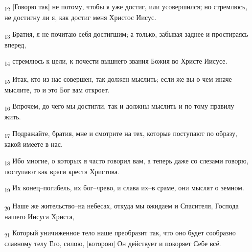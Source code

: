 \begin{tcolorbox}
\textsubscript{12} [Говорю так] не потому, чтобы я уже достиг, или усовершился; но стремлюсь, не достигну ли я, как достиг меня Христос Иисус.
\end{tcolorbox}
\begin{tcolorbox}
\textsubscript{13} Братия, я не почитаю себя достигшим; а только, забывая заднее и простираясь вперед,
\end{tcolorbox}
\begin{tcolorbox}
\textsubscript{14} стремлюсь к цели, к почести вышнего звания Божия во Христе Иисусе.
\end{tcolorbox}
\begin{tcolorbox}
\textsubscript{15} Итак, кто из нас совершен, так должен мыслить; если же вы о чем иначе мыслите, то и это Бог вам откроет.
\end{tcolorbox}
\begin{tcolorbox}
\textsubscript{16} Впрочем, до чего мы достигли, так и должны мыслить и по тому правилу жить.
\end{tcolorbox}
\begin{tcolorbox}
\textsubscript{17} Подражайте, братия, мне и смотрите на тех, которые поступают по образу, какой имеете в нас.
\end{tcolorbox}
\begin{tcolorbox}
\textsubscript{18} Ибо многие, о которых я часто говорил вам, а теперь даже со слезами говорю, поступают как враги креста Христова.
\end{tcolorbox}
\begin{tcolorbox}
\textsubscript{19} Их конец--погибель, их бог--чрево, и слава их--в сраме, они мыслят о земном.
\end{tcolorbox}
\begin{tcolorbox}
\textsubscript{20} Наше же жительство--на небесах, откуда мы ожидаем и Спасителя, Господа нашего Иисуса Христа,
\end{tcolorbox}
\begin{tcolorbox}
\textsubscript{21} Который уничиженное тело наше преобразит так, что оно будет сообразно славному телу Его, силою, [которою] Он действует и покоряет Себе всё.
\end{tcolorbox}
